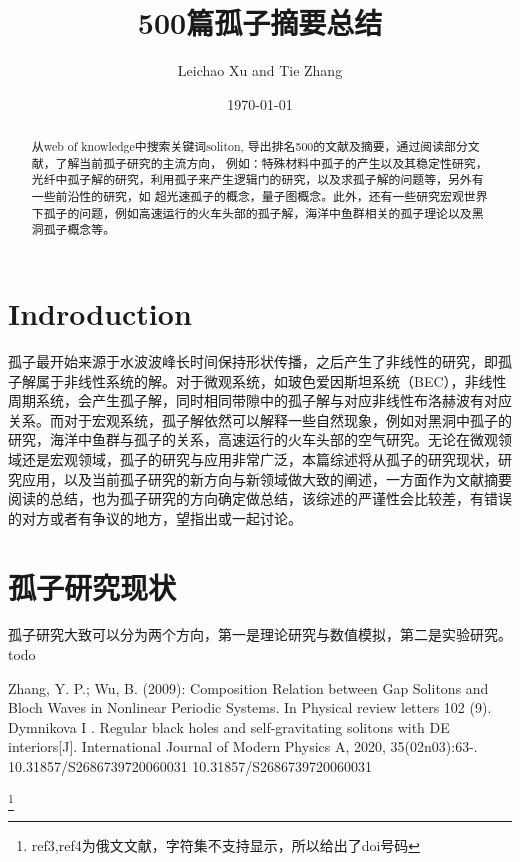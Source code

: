 \documentclass{article}
\begin{document}
\title{500篇孤子摘要总结}

\author{Leichao Xu and Tie Zhang}

\date{\today}



\maketitle
\begin{abstract}
从web of knowledge中搜索关键词soliton, 导出排名500的文献及摘要，通过阅读部分文献，了解当前孤子研究的主流方向，
例如：特殊材料中孤子的产生以及其稳定性研究，光纤中孤子解的研究，利用孤子来产生逻辑门的研究，以及求孤子解的问题等，另外有一些前沿性的研究，如
超光速孤子的概念，量子图概念。此外，还有一些研究宏观世界下孤子的问题，例如高速运行的火车头部的孤子解，海洋中鱼群相关的孤子理论以及黑洞孤子概念等。
\end{abstract}
\begin{multicols}{2}
\section{Indroduction}
孤子最开始来源于水波波峰长时间保持形状传播，之后产生了非线性的研究，即孤子解属于非线性系统的解。对于微观系统，如玻色爱因斯坦系统（BEC），非线性周期系统，会产生孤子解，同时相同带隙中的孤子解与对应非线性布洛赫波有对应关系\cite{ref1}。而对于宏观系统，孤子解依然可以解释一些自然现象，例如对黑洞中孤子的研究\cite{ref2}，海洋中鱼群与孤子的关系\cite{ref3}，高速运行的火车头部的空气研究\cite{ref4}。无论在微观领域还是宏观领域，孤子的研究与应用非常广泛，本篇综述将从孤子的研究现状，研究应用，以及当前孤子研究的新方向与新领域做大致的阐述，一方面作为文献摘要阅读的总结，也为孤子研究的方向确定做总结，该综述的严谨性会比较差，有错误的对方或者有争议的地方，望指出或一起讨论。

\section{孤子研究现状}
孤子研究大致可以分为两个方向，第一是理论研究与数值模拟，第二是实验研究。{todo}
\end{multicols}
\begin{thebibliography}{99}  
Zhang, Y. P.; Wu, B. (2009): Composition Relation between Gap Solitons and Bloch Waves in Nonlinear Periodic Systems. In Physical review letters 102 (9). 
Dymnikova I . Regular black holes and self-gravitating solitons with DE interiors[J]. International Journal of Modern Physics A, 2020, 35(02n03):63-.
10.31857/S2686739720060031
10.31857/S2686739720060031
\end{thebibliography}
\footnote{ref3,ref4为俄文文献，字符集不支持显示，所以给出了doi号码} 
\end{document}
